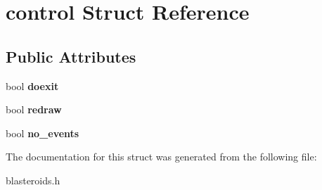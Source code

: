 \hypertarget{structcontrol}{}\section{control Struct Reference}
\label{structcontrol}
\subsection*{Public Attributes}
\begin{DoxyCompactItemize}
\item 
\hypertarget{structcontrol_a12d69546c587faf552e68605b0a2ca82}{}bool {\bfseries doexit}\label{structcontrol_a12d69546c587faf552e68605b0a2ca82}

\item 
\hypertarget{structcontrol_ac3e07b8fda5c904520d78cc7d40b75e1}{}bool {\bfseries redraw}\label{structcontrol_ac3e07b8fda5c904520d78cc7d40b75e1}

\item 
\hypertarget{structcontrol_af474b4749802d541938971fc7c303533}{}bool {\bfseries no\+\_\+events}\label{structcontrol_af474b4749802d541938971fc7c303533}

\end{DoxyCompactItemize}


The documentation for this struct was generated from the following file\+:\begin{DoxyCompactItemize}
\item 
blasteroids.\+h\end{DoxyCompactItemize}
